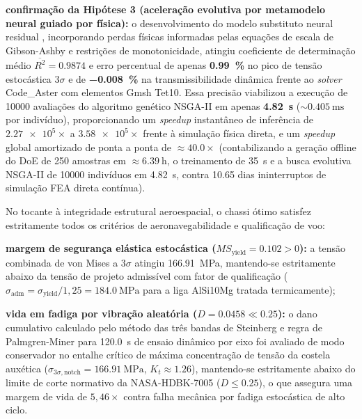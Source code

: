 \begin{alineas}
  \item \textbf{confirmação da Hipótese 3 (aceleração evolutiva por metamodelo neural guiado por física):} o desenvolvimento do modelo substituto neural residual , incorporando perdas físicas informadas pelas equações de escala de Gibson-Ashby e restrições de monotonicidade, atingiu coeficiente de determinação médio $\overline{R^2} = \num{0.9874}$ e erro percentual de apenas \textbf{\SI{+0.99}{\percent}} no pico de tensão estocástica $3\sigma$ e de \textbf{\SI{-0.008}{\percent}} na transmissibilidade dinâmica frente ao \textit{solver} Code\_Aster com elementos Gmsh Tet10. Essa precisão viabilizou a execução de \num{10000} avaliações do algoritmo genético NSGA-II em apenas \textbf{\SI{4.82}{\second}} ($\sim \SI{0.405}{\milli\second}$ por indivíduo), proporcionando um \textit{speedup} instantâneo de inferência de $\num{2.27e5}\times$ a $\num{3.58e5}\times$ frente à simulação física direta, e um \textit{speedup} global amortizado de ponta a ponta de $\approx \num{40.0}\times$ (contabilizando a geração offline do DoE de 250 amostras em $\approx \SI{6.39}{\hour}$, o treinamento de \SI{35}{\second} e a busca evolutiva NSGA-II de \num{10000} indivíduos em \SI{4.82}{\second}, contra \num{10.65} dias ininterruptos de simulação FEA direta contínua).
\end{alineas}

No tocante à integridade estrutural aeroespacial, o chassi ótimo satisfez estritamente todos os critérios de aeronavegabilidade e qualificação de voo:
\begin{alineas}
  \item \textbf{margem de segurança elástica estocástica ($MS_{\text{yield}} = \num{+0.102} > 0$):} a tensão combinada de von Mises a $3\sigma$ atingiu \SI{166.91}{\mega\pascal}, mantendo-se estritamente abaixo da tensão de projeto admissível com fator de qualificação ($\sigma_{\text{adm}} = \sigma_{\text{yield}} / 1{,}25 = \SI{184.0}{\mega\pascal}$ para a liga AlSi10Mg tratada termicamente);
  \item \textbf{vida em fadiga por vibração aleatória ($D = \num{0.0458} \ll \num{0.25}$):} o dano cumulativo calculado pelo método das três bandas de Steinberg e regra de Palmgren-Miner para \SI{120.0}{\second} de ensaio dinâmico por eixo foi avaliado de modo conservador no entalhe crítico de máxima concentração de tensão da costela auxética ($\sigma_{3\sigma,\text{notch}} = \SI{166.91}{\mega\pascal}$, $K_t \approx \num{1.26}$), mantendo-se estritamente abaixo do limite de corte normativo da NASA-HDBK-7005 ($D \le \num{0.25}$), o que assegura uma margem de vida de $5{,}46\times$ contra falha mecânica por fadiga estocástica de alto ciclo.
\end{alineas}

